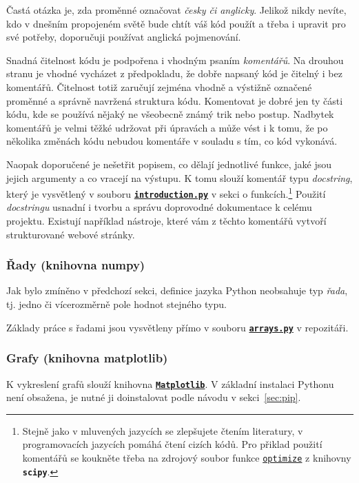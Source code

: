 \documentclass[a4paper,11pt,twoside]{article}
\def\code#1{\textnormal{\texttt{#1}}}
\def\file#1{\textnormal{\textbf{\texttt{#1}}}}
\def\ghfile#1#2{\textnormal{\textbf{\texttt{\href{https://github.com/PavelStransky/PCInPhysics2021/blob/main/#1#2}{#2}}}}}
\theoremstyle{red}
\theoremstyle{green}
\begin{document}
    Častá otázka je, zda proměnné označovat \emph{česky či anglicky}.
    Jelikož nikdy nevíte, kdo v dnešním propojeném světě bude chtít váš kód použít a třeba i upravit pro své potřeby, doporučuji používat anglická pojmenování.
    
    Snadná čitelnost kódu je podpořena i vhodným psaním \emph{komentářů}.
    Na drouhou stranu je vhodné vycházet z předpokladu, že dobře napsaný kód je čitelný i bez komentářů.
    Čitelnost totiž zaručují zejména vhodně a výstižně označené proměnné a správně navržená struktura kódu.
    Komentovat je dobré jen ty části kódu, kde se používá nějaký ne všeobecně známý trik nebo postup.
    Nadbytek komentářů je velmi těžké udržovat při úpravách a může vést i k tomu, že po několika změnách kódu nebudou komentáře v souladu s tím, co kód vykonává.
    
    Naopak doporučené je nešetřit popisem, co dělají jednotlivé funkce, jaké jsou jejich argumenty a co vracejí na výstupu.
    K tomu slouží komentář typu \emph{docstring}, který je vysvětlený v souboru \ghfile{python/basics/}{introduction.py} v sekci o funkcích.\footnote{
        Stejně jako v mluvených jazycích se zlepšujete čtením literatury, v programovacích jazycích pomáhá čtení cizích kódů.
        Pro přiklad použití komentářů se koukněte třeba na zdrojový soubor funkce \code{\href{https://github.com/scipy/scipy/blob/master/scipy/optimize/optimize.py}{optimize}} z knihovny \file{scipy}.
    }
    Použití \emph{docstringu} usnadní i tvorbu a správu doprovodné dokumentace k celému projektu.
    Existují například nástroje, které vám z těchto komentářů vytvoří strukturované webové stránky.

\subsubsection{Řady (knihovna numpy)}
\label{sec:numpy}
    Jak bylo zmíněno v předchozí sekci, definice jazyka Python neobsahuje typ \emph{řada}, tj. jedno či vícerozměrně pole hodnot stejného typu.

    Základy práce s řadami jsou vysvětleny přímo v souboru \ghfile{python/basics/}{arrays.py} v repozitáři.

\subsubsection{Grafy (knihovna matplotlib)}
    K vykreslení grafů slouží knihovna \file{\href{https://matplotlib.org}{Matplotlib}}.
    V základní instalaci Pythonu není obsažena, je nutné ji doinstalovat podle návodu v sekci~\ref{sec:pip}.
\end{document}
